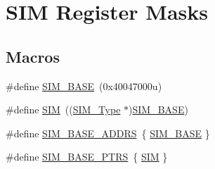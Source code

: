 \hypertarget{group___s_i_m___register___masks}{}\section{S\+IM Register Masks}
\label{group___s_i_m___register___masks}
\subsection*{Macros}
\begin{DoxyCompactItemize}
\item 
\#define \mbox{\hyperlink{group___s_i_m___register___masks_gace1d6947a3e5c9530f00f8c22adcd700}{S\+I\+M\+\_\+\+B\+A\+SE}}~(0x40047000u)
\item 
\#define \mbox{\hyperlink{group___s_i_m___register___masks_ga3dd2f4c4bfb41778902b4b5350143d9e}{S\+IM}}~((\mbox{\hyperlink{struct_s_i_m___type}{S\+I\+M\+\_\+\+Type}} $\ast$)\mbox{\hyperlink{group___s_i_m___register___masks_gace1d6947a3e5c9530f00f8c22adcd700}{S\+I\+M\+\_\+\+B\+A\+SE}})
\item 
\#define \mbox{\hyperlink{group___s_i_m___register___masks_gad0dfdd9f125421e6e0387da3fce02a5d}{S\+I\+M\+\_\+\+B\+A\+S\+E\+\_\+\+A\+D\+D\+RS}}~\{ \mbox{\hyperlink{group___s_i_m___register___masks_gace1d6947a3e5c9530f00f8c22adcd700}{S\+I\+M\+\_\+\+B\+A\+SE}} \}
\item 
\#define \mbox{\hyperlink{group___s_i_m___register___masks_ga2fd213a3b9fc7d761ab0cdeb74c34f91}{S\+I\+M\+\_\+\+B\+A\+S\+E\+\_\+\+P\+T\+RS}}~\{ \mbox{\hyperlink{group___s_i_m___register___masks_ga3dd2f4c4bfb41778902b4b5350143d9e}{S\+IM}} \}
\end{DoxyCompactItemize}
